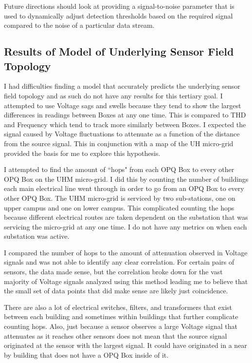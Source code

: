 Future directions should look at providing a signal-to-noise parameter that is used to dynamically adjust detection thresholds based on the required signal compared to the noise of a particular data stream.

\subsection{Results of Model of Underlying Sensor Field Topology}\label{subsec:results-of-model-of-underlying-sensor-field-topology}

I had difficulties finding a model that accurately predicts the underlying sensor field topology and as such do not have any results for this tertiary goal. I attempted to use Voltage sags and swells because they tend to show the largest differences in readings between Boxes at any one time. This is compared to THD and Frequency which tend to track more similarly between Boxes. I expected the signal caused by Voltage fluctuations to attenuate as a function of the distance from the source signal. This in conjunction with a map of the UH micro-grid provided the basis for me to explore this hypothesis.

I attempted to find the amount of ``hops" from each OPQ Box to every other OPQ Box on the UHM micro-grid. I did this by counting the number of buildings each main electrical line went through in order to go from an OPQ Box to every other OPQ Box. The UHM micro-grid is serviced by two sub-stations, one on upper campus and one on lower campus. This complicated counting the hops because different electrical routes are taken dependent on the substation that was servicing the micro-grid at any one time. I do not have any metrics on when each substation was active.

I compared the number of hops to the amount of attenuation observed in Voltage signals and was not able to identify any clear correlation. For certain pairs of sensors, the data made sense, but the correlation broke down for the vast majority of Voltage signals analyzed using this method leading me to believe that the small set of data points that did make sense are likely just coincidence.

There are also a lot of electrical switches, filters, and transformers that exist between each building and sometimes within buildings that further complicate counting hops. Also, just because a sensor observes a large Voltage signal that attenuates as it reaches other sensors does not mean that the source signal originated at the sensor with the largest signal. It could have originated in a near by building that does not have a OPQ Box inside of it.

